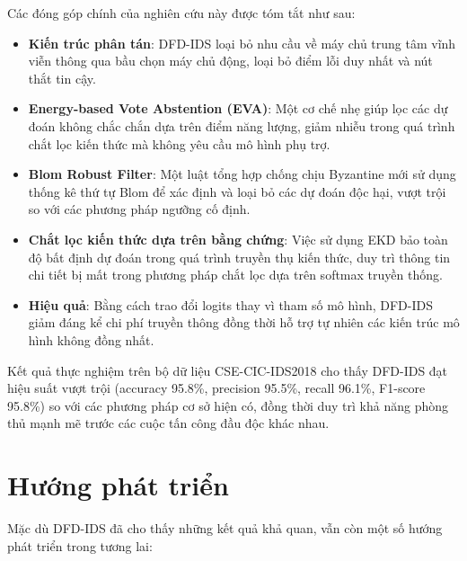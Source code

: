 Các đóng góp chính của nghiên cứu này được tóm tắt như sau:
\begin{itemize}
    \item \textbf{Kiến trúc phân tán}: DFD-IDS loại bỏ nhu cầu về máy chủ trung tâm vĩnh viễn thông qua bầu chọn máy chủ động, loại bỏ điểm lỗi duy nhất và nút thắt tin cậy.
    \item \textbf{Energy-based Vote Abstention (EVA)}: Một cơ chế nhẹ giúp lọc các dự đoán không chắc chắn dựa trên điểm năng lượng, giảm nhiễu trong quá trình chắt lọc kiến thức mà không yêu cầu mô hình phụ trợ.
    \item \textbf{Blom Robust Filter}: Một luật tổng hợp chống chịu Byzantine mới sử dụng thống kê thứ tự Blom để xác định và loại bỏ các dự đoán độc hại, vượt trội so với các phương pháp ngưỡng cố định.
    \item \textbf{Chắt lọc kiến thức dựa trên bằng chứng}: Việc sử dụng EKD bảo toàn độ bất định dự đoán trong quá trình truyền thụ kiến thức, duy trì thông tin chi tiết bị mất trong phương pháp chắt lọc dựa trên softmax truyền thống.
    \item \textbf{Hiệu quả}: Bằng cách trao đổi logits thay vì tham số mô hình, DFD-IDS giảm đáng kể chi phí truyền thông đồng thời hỗ trợ tự nhiên các kiến trúc mô hình không đồng nhất.
\end{itemize}

Kết quả thực nghiệm trên bộ dữ liệu CSE-CIC-IDS2018 cho thấy DFD-IDS đạt hiệu suất vượt trội (accuracy 95.8\%, precision 95.5\%, recall 96.1\%, F1-score 95.8\%) so với các phương pháp cơ sở hiện có, đồng thời duy trì khả năng phòng thủ mạnh mẽ trước các cuộc tấn công đầu độc khác nhau.

\section{Hướng phát triển}
\label{sec:future}

Mặc dù DFD-IDS đã cho thấy những kết quả khả quan, vẫn còn một số hướng phát triển trong tương lai:

